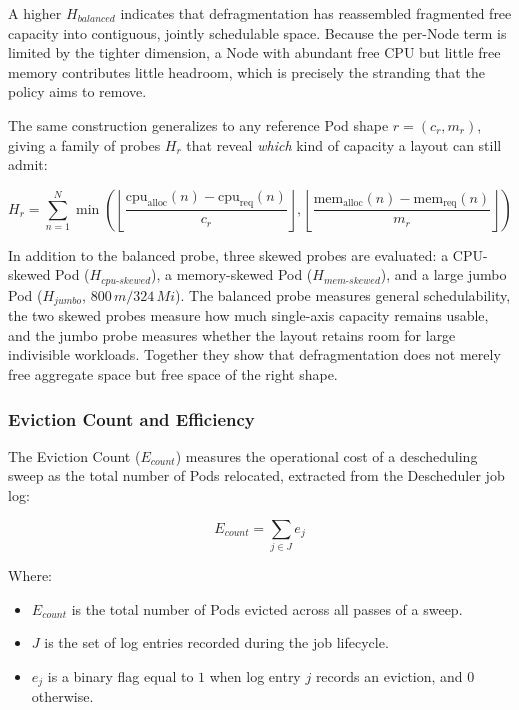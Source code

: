 A higher \(H_{balanced}\) indicates that defragmentation has reassembled fragmented free capacity into contiguous, jointly schedulable space. Because the per-Node term is limited by the tighter dimension, a Node with abundant free CPU but little free memory contributes little headroom, which is precisely the stranding that the policy aims to remove.

The same construction generalizes to any reference Pod shape \(r = (c_r, m_r)\), giving a family of probes \(H_r\) that reveal \emph{which} kind of capacity a layout can still admit:

\[
H_r
=
\sum_{n=1}^{N}
\min\!\left(
\left\lfloor
\frac{\text{cpu}_{\text{alloc}}(n) - \text{cpu}_{\text{req}}(n)}{c_r}
\right\rfloor,
\left\lfloor
\frac{\text{mem}_{\text{alloc}}(n) - \text{mem}_{\text{req}}(n)}{m_r}
\right\rfloor
\right)
\]

In addition to the balanced probe, three skewed probes are evaluated: a CPU-skewed Pod (\(H_{cpu\text{-}skewed}\)), a memory-skewed Pod (\(H_{mem\text{-}skewed}\)), and a large jumbo Pod (\(H_{jumbo}\), \(800\,m/324\,Mi\)). The balanced probe measures general schedulability, the two skewed probes measure how much single-axis capacity remains usable, and the jumbo probe measures whether the layout retains room for large indivisible workloads. Together they show that defragmentation does not merely free aggregate space but free space of the right shape.

\subsubsection{Eviction Count and Efficiency}
\label{subsubsec:defrag_metric_eviction}
The Eviction Count (\(E_{count}\)) measures the operational cost of a descheduling sweep as the total number of Pods relocated, extracted from the Descheduler job log:

\[
E_{count}
=
\sum_{j \in J} e_j
\]

Where:

\begin{itemize}
    \item \(E_{count}\) is the total number of Pods evicted across all passes of a sweep.

    \item \(J\) is the set of log entries recorded during the job lifecycle.

    \item \(e_j\) is a binary flag equal to \(1\) when log entry \(j\) records an eviction, and \(0\) otherwise.
\end{itemize}

